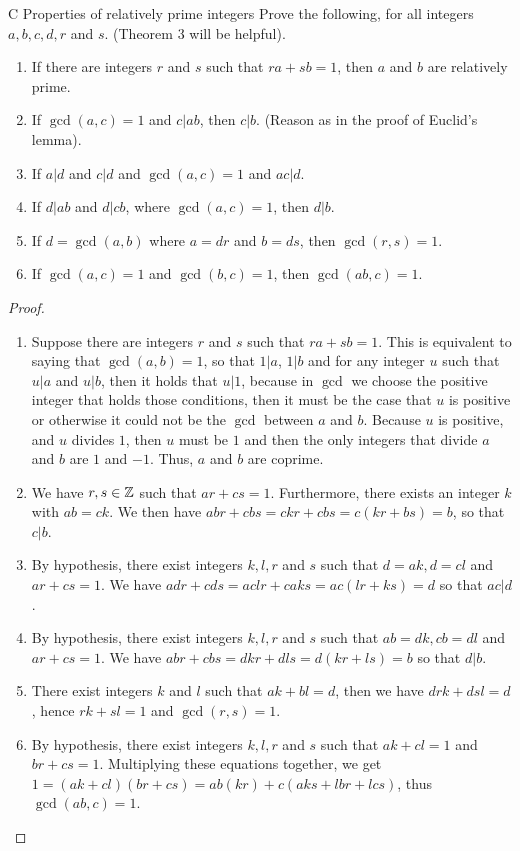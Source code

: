 \begin{exercise}{C Properties of relatively prime integers}
Prove the following, for all integers $a,b,c,d,r$ and $s$. (Theorem 3 will be helpful).
\begin{enumerate}
    \item If there are integers $r$ and $s$ such that $ra+sb=1$, then $a$ and $b$ are relatively prime.
    \item If $\gcd(a,c)=1$ and $c\vert ab$, then $c\vert b$. (Reason as in the proof of Euclid's lemma).
    \item If $a\vert d$ and $c\vert d$ and $\gcd(a,c)=1$ and $ac\vert d$.
    \item If $d\vert ab$ and $d\vert cb$, where $\gcd(a,c)=1$, then $d\vert b$.
    \item If $d=\gcd(a,b)$ where $a=dr$ and $b=ds$, then $\gcd(r,s)=1$.
    \item If $\gcd(a,c)=1$ and $\gcd(b,c)=1$, then $\gcd(ab,c)=1$.
\end{enumerate}
\end{exercise}
\begin{proof}
 \begin{enumerate}
    \item Suppose there are integers $r$ and $s$ such that $ra+sb=1$. This is equivalent to saying that $\gcd(a,b)=1$, so that $1\vert a$, $1\vert b$ and for any integer $u$ such that $u\vert a$ and $u\vert b$, then it holds that $u\vert 1$, because in $\gcd$ we choose the positive integer that holds those conditions, then it must be the case that $u$ is positive or otherwise it could not be the $\gcd$ between $a$ and $b$. Because $u$ is positive, and $u$ divides $1$, then $u$ must be $1$ and then the only integers that divide $a$ and $b$ are $1$ and $-1$. Thus, $a$ and $b$ are coprime.
    \item We have $r,s\in\mathbb{Z}$ such that $ar+cs=1$. Furthermore, there exists an integer $k$ with $ab=ck$. We then have $abr+cbs=ckr+cbs=c(kr+bs)=b$, so that $c\vert b$.
    \item By hypothesis, there exist integers $k,l,r$ and $s$ such that $d=ak, d=cl$ and $ar+cs=1$. We have $adr+cds=aclr+caks=ac(lr+ks)=d$ so that $ac\vert d$.
    \item By hypothesis, there exist integers $k,l,r$ and $s$ such that $ab=dk, cb=dl$ and $ar+cs=1$. We have $abr+cbs=dkr+dls=d(kr+ls)=b$ so that $d\vert b$.
    \item There exist integers $k$ and $l$ such that $ak+bl=d$, then we have $drk+dsl=d$, hence $rk+sl=1$ and $\gcd(r,s)=1$.
    \item By hypothesis, there exist integers $k,l,r$ and $s$ such that $ak+cl=1$ and $br+cs=1$. Multiplying these equations together, we get $1=(ak+cl)(br+cs)=ab(kr)+c(aks+lbr+lcs)$, thus $\gcd(ab,c)=1$.
\end{enumerate}
\end{proof}


